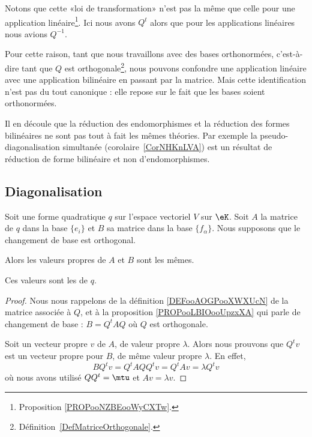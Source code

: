 \begin{remark}      \label{REMooNEJLooSqgeih}
    Notons que cette «loi de transformation» n'est pas la même que celle pour une application linéaire\footnote{Proposition \ref{PROPooNZBEooWyCXTw}.}. Ici nous avons \( Q^t\) alors que pour les applications linéaires nous avions \( Q^{-1}\).

    Pour cette raison, tant que nous travaillons avec des bases orthonormées, c'est-à-dire tant que \( Q\) est orthogonale\footnote{Définition~\ref{DefMatriceOrthogonale}.}, nous pouvons confondre une application linéaire avec une application bilinéaire en passant par la matrice. Mais cette identification n'est pas du tout canonique : elle repose sur le fait que les bases soient orthonormées.

    Il en découle que la réduction des endomorphismes et la réduction des formes bilinéaires ne sont pas tout à fait les mêmes théories. Par exemple la pseudo-diagonalisation simultanée (corolaire~\ref{CorNHKnLVA}) est un résultat de réduction de forme bilinéaire et non d'endomorphismes.
\end{remark}

\subsection{Diagonalisation}

\begin{lemmaDef}        \label{DEFooGVGGooWQEIET}
    Soit une forme quadratique \( q\) sur l'espace vectoriel \( V\) sur \( \eK\). Soit \( A\) la matrice de \( q\) dans la base \( \{ e_i \}\) et \( B\) sa matrice dans la base \( \{f_{\alpha}  \}\). Nous supposons que le changement de base est orthogonal.

    Alors les valeurs propres de \( A\) et \( B\) sont les mêmes.

    Ces valeurs sont les  de \( q\).
\end{lemmaDef}

\begin{proof}
    Nous nous rappelons de la définition \ref{DEFooAOGPooXWXUcN} de la matrice associée à \( Q\), et à la proposition \ref{PROPooLBIOooUpzxXA} qui parle de changement de base : \( B=Q^tAQ\) où \( Q\) est orthogonale.

    Soit un vecteur propre \( v\) de \(A \), de valeur propre \( \lambda\). Alors nous prouvons que \( Q^tv\) est un vecteur propre pour \( B\), de même valeur propre \( \lambda\). En effet,
    \begin{equation}
        BQ^tv=Q^tAQQ^tv=Q^tAv=\lambda Q^tv
    \end{equation}
    où nous avons utilisé \( QQ^t=\mtu\) et \( Av=\lambda v\).
\end{proof}

